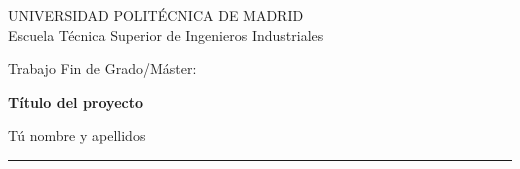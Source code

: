 \documentclass[11pt,a4paper,twoside,openright]{report}
\author{Nombre y apellidos}
\begin{document}

\begin{titlepage}

\begin{figure}
\hspace{60mm}
\end{figure}

\begin{center}

\begin{Large}
\vspace*{10mm}
UNIVERSIDAD POLITÉCNICA DE MADRID \\
\vspace*{5mm}
Escuela Técnica Superior de Ingenieros Industriales
\end{Large}

\vfill

{\large Trabajo Fin de Grado/Máster: \\}

\vspace*{5mm}

\textbf{{\LARGE Título del proyecto}}

\vspace*{10mm}

{\large Tú nombre y apellidos}

\vspace*{3mm}

\rule{\textwidth}{0.1mm}


\end{center}
\end{titlepage}
\end{document}
